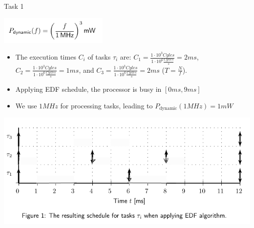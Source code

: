 \begin{frame}[allowframebreaks]{Task 1}{}
\begin{tasknoinc}
    \includegraphics[width=0.4\textwidth]{./figures/task1_power.png}
  \end{tasknoinc}
  \begin{solutionnoinc}
    \begin{itemize}
      \item The execution times $C_i$ of tasks $\tau_i$ are: $C_1 = \frac{1 \cdot 10^3 Cyles}{1 \cdot 10^6 \frac{Cycles}{s}} =  2 ms$, $C_2 = \frac{1 \cdot 10^3 Cyles}{1 \cdot 10^6 \frac{Cycles}{s}} =  1 ms$, and $C_3 = \frac{1 \cdot 10^3 Cyles}{1 \cdot 10^6 \frac{Cycles}{s}}  = 2 ms$ ($T = \frac{N}{f}$).
      \item Applying EDF schedule, the processor is busy in $[0 ms, 9 ms]$
      \if{}\fi
      \item We use $1MHz$ for processing tasks, leading to $P_{\text{dynamic}}(1MHz) = 1mW$
      \if{}
      \fi
    \end{itemize}
  \end{solutionnoinc}
  \begin{solutionnoinc}
    \centering
    \includegraphics[height=0.6\paperheight]{./figures/task1_schedule_empty.png}

\end{solutionnoinc}
\end{frame}

